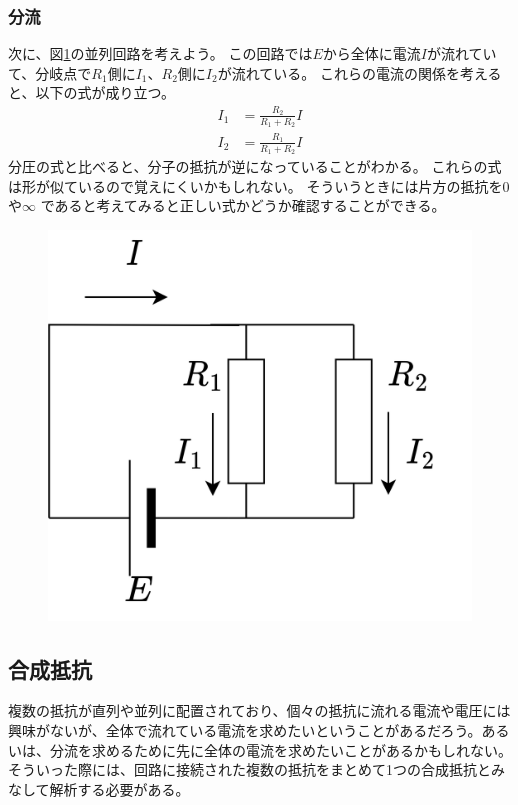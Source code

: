 \documentclass{ltjsreport}
\begin{document}
\subsubsection{分流}
次に、図\ref{fig:current_partial}の並列回路を考えよう。
この回路では$E$から全体に電流$I$が流れていて、分岐点で$R_1$側に$I_1$、$R_2$側に$I_2$が流れている。
これらの電流の関係を考えると、以下の式が成り立つ。
\begin{align}
  I_1 &= \frac{R_2}{R_1+R_2}I\\
  I_2 &= \frac{R_1}{R_1+R_2}I
\end{align}
分圧の式と比べると、分子の抵抗が逆になっていることがわかる。
これらの式は形が似ているので覚えにくいかもしれない。
そういうときには片方の抵抗を$0$や$\infty$ であると考えてみると正しい式かどうか確認することができる。

\begin{figure}[tb]
  \centering
  \includegraphics[keepaspectratio, scale=0.07]
       {img/para.drawio.png}
  \caption{}
  \label{fig:current_partial}
 \end{figure}

\subsection{合成抵抗}
複数の抵抗が直列や並列に配置されており、個々の抵抗に流れる電流や電圧には興味がないが、全体で流れている電流を求めたいということがあるだろう。あるいは、分流を求めるために先に全体の電流を求めたいことがあるかもしれない。
そういった際には、回路に接続された複数の抵抗をまとめて1つの合成抵抗とみなして解析する必要がある。
\end{document}
